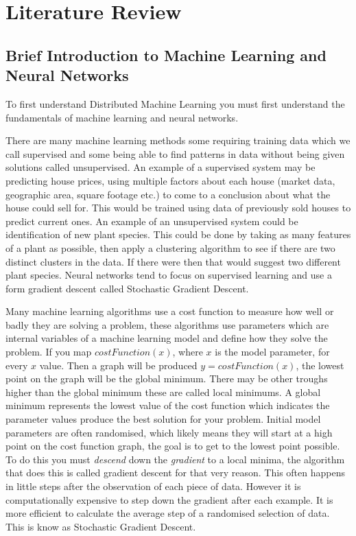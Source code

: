 \clearpage
\section{Literature Review}
\subsection{Brief Introduction to Machine Learning and Neural Networks}
To first understand Distributed Machine Learning you must first understand the
fundamentals of machine learning and neural networks. 

There are many machine learning methods some requiring training data which we
call supervised and some being able to find patterns in data without being given
solutions called unsupervised. \cite{alpaydin2020introduction} An example of a
supervised system may be predicting house prices, using multiple factors about
each house (market data, geographic area, square footage etc.) to come to a
conclusion about what the house could sell for. This would be trained using data
of previously sold houses to predict current ones. An example of an unsupervised
system could be identification of new plant species. This could be done by
taking as many features of a plant as possible, then apply a clustering
algorithm to see if there are two distinct clusters in the data. If there were
then that would suggest two different plant species. Neural networks tend to
focus on supervised learning and use a form gradient descent called Stochastic
Gradient Descent.

Many machine learning algorithms use a cost function to measure how well or
badly they are solving a problem, these algorithms use parameters which are
internal variables of a machine learning model and define how they solve the
problem. If you map \(costFunction(x)\), where \(x\) is the model parameter, for
every \(x\) value. Then a graph will be produced \(y = costFunction(x)\), the
lowest point on the graph will be the global minimum. There may be other troughs
higher than the global minimum these are called local minimums. A global minimum
represents the lowest value of the cost function which indicates the parameter
values produce the best solution for your problem. Initial model parameters are
often randomised, which likely means they will start at a high point on the cost
function graph, the goal is to get to the lowest point possible. To do this you
must \textit{descend} down the \textit{gradient} to a local minima, the
algorithm that does this is called gradient descent for that very reason. This
often happens in little steps after the observation of each piece of data.
However it is computationally expensive to step down the gradient after each
example. It is more efficient to calculate the average step of a randomised
selection of data. This is know as Stochastic Gradient Descent.


